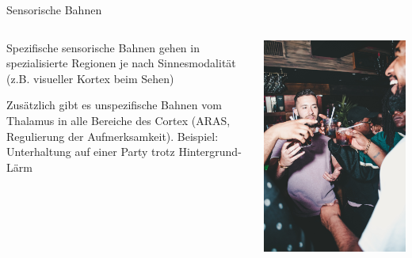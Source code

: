 \documentclass{beamer}
\begin{document}
\begin{frame}{Sensorische Bahnen}


\begin{columns}[c]

\begin{column}{5cm} 
Spezifische sensorische Bahnen gehen in spezialisierte Regionen je nach Sinnesmodalität (z.B. visueller Kortex beim Sehen)  \\[0.2 cm]

\pause

Zusätzlich gibt es unspezifische Bahnen vom Thalamus in alle Bereiche des Cortex (ARAS, Regulierung der Aufmerksamkeit). Beispiel: Unterhaltung auf einer Party trotz Hintergrund-Lärm

\end{column}

\begin{column}{5cm}
\begin{center}
    \includegraphics[width=\textwidth]{party.jpg}
\end{center}

\end{column}


\end{columns}







\end{frame}
\end{document}
